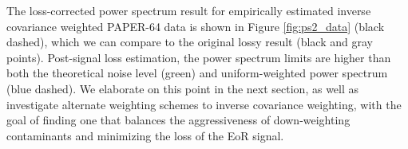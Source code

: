 \documentclass[preprint2,numberedappendix,tighten]{aastex6}
\begin{document}

The loss-corrected power spectrum result for empirically estimated inverse covariance weighted PAPER-64 data is shown in Figure \ref{fig:ps2_data} (black dashed), which we can compare to the original lossy result (black and gray points). %
Post-signal loss estimation, the power spectrum limits are higher than both the theoretical noise level (green) and uniform-weighted power spectrum (blue dashed). We elaborate on this point in the next section, as well as investigate alternate 
weighting schemes to inverse covariance weighting, with the goal of finding one that balances the aggressiveness of down-weighting contaminants and minimizing the loss of the EoR signal. 
\end{document}
